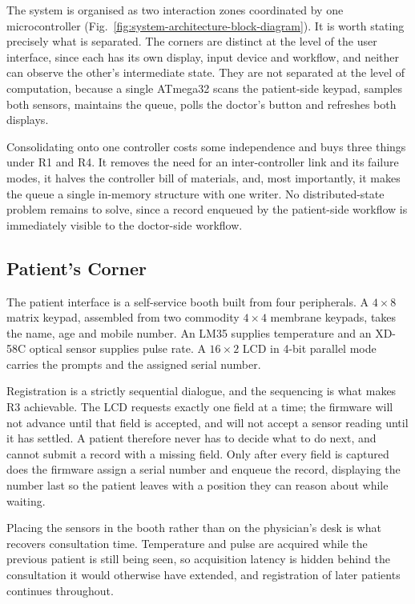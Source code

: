 

The system is organised as two interaction zones coordinated by one microcontroller
(Fig.~\ref{fig:system-architecture-block-diagram}). It is worth stating precisely what is
separated. The corners are distinct at the level of the user interface, since each has its own
display, input device and workflow, and neither can observe the other's intermediate state. They
are not separated at the level of computation, because a single ATmega32 scans the patient-side
keypad, samples both sensors, maintains the queue, polls the doctor's button and refreshes both
displays.

Consolidating onto one controller costs some independence and buys three things under R1 and R4. It
removes the need for an inter-controller link and its failure modes, it halves the controller bill of
materials, and, most importantly, it makes the queue a single in-memory structure with one writer. No
distributed-state problem remains to solve, since a record enqueued by the patient-side workflow is
immediately visible to the doctor-side workflow.

\subsection{Patient's Corner}
The patient interface is a self-service booth built from four peripherals. A $4\times8$ matrix
keypad, assembled from two commodity $4\times4$ membrane keypads, takes the name, age and mobile
number. An LM35 supplies temperature and an XD-58C optical sensor supplies pulse rate. A
$16\times2$ LCD in 4-bit parallel mode carries the prompts and the assigned serial number.

Registration is a strictly sequential dialogue, and the sequencing is what makes R3 achievable. The
LCD requests exactly one field at a time; the firmware will not advance until that field is accepted,
and will not accept a sensor reading until it has settled. A patient therefore never has to decide
what to do next, and cannot submit a record with a missing field. Only after every field is captured
does the firmware assign a serial number and enqueue the record, displaying the number last so the
patient leaves with a position they can reason about while waiting.

Placing the sensors in the booth rather than on the physician's desk is what recovers consultation
time. Temperature and pulse are acquired while the previous patient is still being seen, so
acquisition latency is hidden behind the consultation it would otherwise have extended, and
registration of later patients continues throughout.

